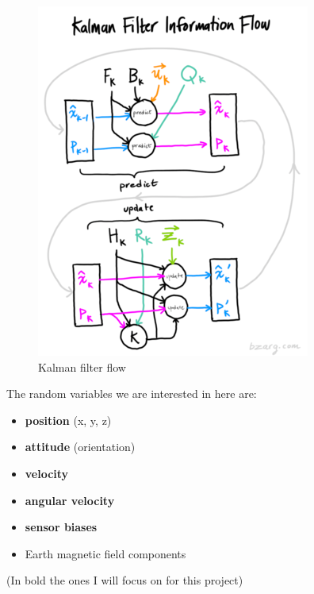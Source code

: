 \begin{frame}{}

\begin{figure}
\centering
\includegraphics{kalflow.png}
\caption{Kalman filter flow}
\end{figure}

\end{frame}

\begin{frame}{}

The random variables we are interested in here are:

\begin{itemize}
\tightlist
\item
  \textbf{position} (x, y, z)
\item
  \textbf{attitude} (orientation)
\item
  \textbf{velocity}
\item
  \textbf{angular velocity}
\item
  \textbf{sensor biases}
\item
  Earth magnetic field components
\end{itemize}

(In bold the ones I will focus on for this project)

\end{frame}

